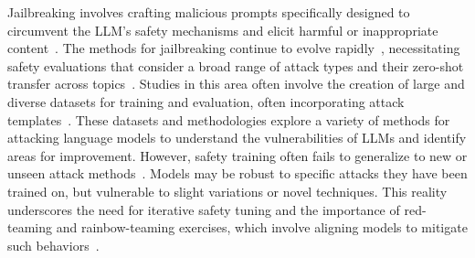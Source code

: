 Jailbreaking involves crafting malicious prompts specifically designed to circumvent the LLM’s safety mechanisms and elicit harmful or inappropriate content~\cite{chao2024jailbreakingblackboxlarge}. The methods for jailbreaking continue to evolve rapidly~\cite{chowdhury2024breakingdefensescomparativesurvey,yi2024jailbreakattacksdefenseslarge}, necessitating safety evaluations that consider a broad range of attack types and their zero-shot transfer across topics~\cite{shaikh2023secondthoughtletsthink,li2024deepinceptionhypnotizelargelanguage,wei2024jailbreakguardalignedlanguage,ding2024wolfsheepsclothinggeneralized,chen2024redteaminggpt4vgpt4v}. Studies in this area often involve the creation of large and diverse datasets for training and evaluation, often incorporating attack templates~\cite{liu2024autodangeneratingstealthyjailbreak,yu2024gptfuzzerredteaminglarge,chao2024jailbreakingblackboxlarge,mehrotra2024treeattacksjailbreakingblackbox,fernando2023promptbreederselfreferentialselfimprovementprompt}. These datasets and methodologies explore a variety of methods for attacking language models to understand the vulnerabilities of LLMs and identify areas for improvement. However, safety training often fails to generalize to new or unseen attack methods~\cite{mou2024sgbenchevaluatingllmsafety}. Models may be robust to specific attacks they have been trained on, but vulnerable to slight variations or novel techniques. This reality underscores the need for iterative safety tuning and the importance of red-teaming and rainbow-teaming exercises, which involve aligning models to mitigate such behaviors~\cite{ganguli2022redteaminglanguagemodels,perez2022redteaminglanguagemodels,samvelyan2024rainbowteamingopenendedgeneration}. 




